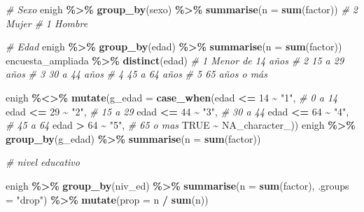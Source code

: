 \documentclass[
  12pt,
]{book}
\newenvironment{Shaded}{\begin{snugshade}}{\end{snugshade}}
\newcommand{\AttributeTok}[1]{\textcolor[rgb]{0.13,0.29,0.53}{#1}}
\newcommand{\CommentTok}[1]{\textcolor[rgb]{0.56,0.35,0.01}{\textit{#1}}}
\newcommand{\ConstantTok}[1]{\textcolor[rgb]{0.56,0.35,0.01}{#1}}
\newcommand{\DecValTok}[1]{\textcolor[rgb]{0.00,0.00,0.81}{#1}}
\newcommand{\FunctionTok}[1]{\textcolor[rgb]{0.13,0.29,0.53}{\textbf{#1}}}
\newcommand{\NormalTok}[1]{#1}
\newcommand{\SpecialCharTok}[1]{\textcolor[rgb]{0.81,0.36,0.00}{\textbf{#1}}}
\newcommand{\StringTok}[1]{\textcolor[rgb]{0.31,0.60,0.02}{#1}}
\begin{document}
\begin{Shaded}
\begin{Highlighting}[]
\CommentTok{\# Sexo }
\NormalTok{enigh }\SpecialCharTok{\%\textgreater{}\%} \FunctionTok{group\_by}\NormalTok{(sexo) }\SpecialCharTok{\%\textgreater{}\%} \FunctionTok{summarise}\NormalTok{(}\AttributeTok{n =} \FunctionTok{sum}\NormalTok{(factor))}
\CommentTok{\# 2 Mujer}
\CommentTok{\# 1 Hombre}

\CommentTok{\# Edad }
\NormalTok{enigh }\SpecialCharTok{\%\textgreater{}\%} \FunctionTok{group\_by}\NormalTok{(edad) }\SpecialCharTok{\%\textgreater{}\%} \FunctionTok{summarise}\NormalTok{(}\AttributeTok{n =} \FunctionTok{sum}\NormalTok{(factor))}
\NormalTok{encuesta\_ampliada }\SpecialCharTok{\%\textgreater{}\%} \FunctionTok{distinct}\NormalTok{(edad)}
\CommentTok{\# 1 Menor de 14 años}
\CommentTok{\# 2 15 a 29 años}
\CommentTok{\# 3 30 a 44 años}
\CommentTok{\# 4 45 a 64 años}
\CommentTok{\# 5 65 años o más}

\NormalTok{enigh }\SpecialCharTok{\%\textless{}\textgreater{}\%} \FunctionTok{mutate}\NormalTok{(}\AttributeTok{g\_edad =} \FunctionTok{case\_when}\NormalTok{(edad }\SpecialCharTok{\textless{}=} \DecValTok{14} \SpecialCharTok{\textasciitilde{}} \StringTok{"1"}\NormalTok{, }\CommentTok{\# 0 a 14}
\NormalTok{                                     edad }\SpecialCharTok{\textless{}=} \DecValTok{29} \SpecialCharTok{\textasciitilde{}} \StringTok{"2"}\NormalTok{, }\CommentTok{\# 15 a 29}
\NormalTok{                                     edad }\SpecialCharTok{\textless{}=} \DecValTok{44} \SpecialCharTok{\textasciitilde{}} \StringTok{"3"}\NormalTok{, }\CommentTok{\# 30 a 44}
\NormalTok{                                     edad }\SpecialCharTok{\textless{}=} \DecValTok{64} \SpecialCharTok{\textasciitilde{}} \StringTok{"4"}\NormalTok{, }\CommentTok{\# 45 a 64}
\NormalTok{                                     edad }\SpecialCharTok{\textgreater{}}  \DecValTok{64} \SpecialCharTok{\textasciitilde{}} \StringTok{"5"}\NormalTok{, }\CommentTok{\# 65 o mas}
                                     \ConstantTok{TRUE} \SpecialCharTok{\textasciitilde{}} \ConstantTok{NA\_character\_}\NormalTok{)) }
\NormalTok{enigh }\SpecialCharTok{\%\textgreater{}\%} \FunctionTok{group\_by}\NormalTok{(g\_edad) }\SpecialCharTok{\%\textgreater{}\%} \FunctionTok{summarise}\NormalTok{(}\AttributeTok{n =} \FunctionTok{sum}\NormalTok{(factor))}

\CommentTok{\# nivel educativo}

\NormalTok{enigh }\SpecialCharTok{\%\textgreater{}\%} \FunctionTok{group\_by}\NormalTok{(niv\_ed) }\SpecialCharTok{\%\textgreater{}\%}
  \FunctionTok{summarise}\NormalTok{(}\AttributeTok{n =} \FunctionTok{sum}\NormalTok{(factor), }\AttributeTok{.groups =} \StringTok{"drop"}\NormalTok{) }\SpecialCharTok{\%\textgreater{}\%}
  \FunctionTok{mutate}\NormalTok{(}\AttributeTok{prop =}\NormalTok{ n }\SpecialCharTok{/} \FunctionTok{sum}\NormalTok{(n))}


\end{Highlighting}
\end{Shaded}
\end{document}
